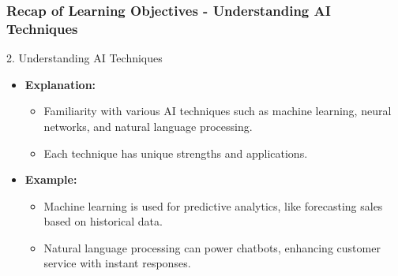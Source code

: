 \documentclass[aspectratio=169]{beamer}
\begin{document}
\begin{frame}[fragile]
    \frametitle{Recap of Learning Objectives - Understanding AI Techniques}
    \begin{block}{2. Understanding AI Techniques}
        \begin{itemize}
            \item \textbf{Explanation:}
            \begin{itemize}
                \item Familiarity with various AI techniques such as machine learning, neural networks, and natural language processing.
                \item Each technique has unique strengths and applications.
            \end{itemize}
            \item \textbf{Example:}
            \begin{itemize}
                \item Machine learning is used for predictive analytics, like forecasting sales based on historical data.
                \item Natural language processing can power chatbots, enhancing customer service with instant responses.
            \end{itemize}
        \end{itemize}
    \end{block}
\end{frame}
\end{document}

